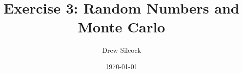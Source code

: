 \documentclass[aps,twocolumn,nobalancelastpage]{revtex4}
\begin{document}
\title{Exercise 3: Random Numbers and Monte Carlo}
\author{Drew Silcock}
\date{\today}

\maketitle





\newpage


\end{document}
